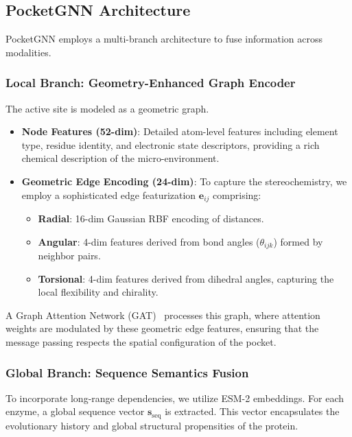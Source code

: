 \documentclass[11pt]{article}
\begin{document}
\subsection{PocketGNN Architecture}
\label{sec:model}

PocketGNN employs a multi-branch architecture to fuse information across modalities.

\subsubsection{Local Branch: Geometry-Enhanced Graph Encoder}
The active site is modeled as a geometric graph.
\begin{itemize}
    \item \textbf{Node Features (52-dim)}: Detailed atom-level features including element type, residue identity, and electronic state descriptors, providing a rich chemical description of the micro-environment.
    \item \textbf{Geometric Edge Encoding (24-dim)}: To capture the stereochemistry, we employ a sophisticated edge featurization $\mathbf{e}_{ij}$ comprising:
    \begin{itemize}
        \item \textbf{Radial}: 16-dim Gaussian RBF encoding of distances.
        \item \textbf{Angular}: 4-dim features derived from bond angles ($\theta_{ijk}$) formed by neighbor pairs.
        \item \textbf{Torsional}: 4-dim features derived from dihedral angles, capturing the local flexibility and chirality.
    \end{itemize}
\end{itemize}
A Graph Attention Network (GAT)~\citep{velickovic2018graph} processes this graph, where attention weights are modulated by these geometric edge features, ensuring that the message passing respects the spatial configuration of the pocket.

\subsubsection{Global Branch: Sequence Semantics Fusion}
To incorporate long-range dependencies, we utilize ESM-2 embeddings. For each enzyme, a global sequence vector $\mathbf{s}_{\text{seq}}$ is extracted. This vector encapsulates the evolutionary history and global structural propensities of the protein.
\end{document}

